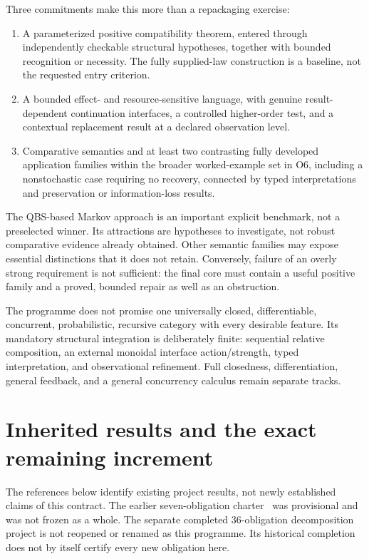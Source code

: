 \documentclass[11pt,a4paper]{article}
\begin{document}
Three commitments make this more than a repackaging exercise:
\begin{enumerate}
\item A parameterized positive compatibility theorem, entered through
independently checkable structural hypotheses, together with bounded
recognition or necessity. The fully supplied-law construction is a baseline,
not the requested entry criterion.
\item A bounded effect- and resource-sensitive language, with genuine
result-dependent continuation interfaces, a controlled higher-order test,
and a contextual replacement result at a declared observation level.
\item Comparative semantics and at least two contrasting fully developed
application families within the broader worked-example set in O6, including
a nonstochastic case requiring no recovery, connected by typed
interpretations and preservation or information-loss results.
\end{enumerate}

The QBS-based Markov approach is an important explicit benchmark, not a
preselected winner. Its attractions are hypotheses to investigate, not robust
comparative evidence already obtained. Other semantic families may expose
essential distinctions that it does not retain. Conversely, failure of an
overly strong requirement is not sufficient: the final core must contain a
useful positive family and a proved, bounded repair as well as an obstruction.

The programme does not promise one universally closed, differentiable,
concurrent, probabilistic, recursive category with every desirable feature.
Its mandatory structural integration is deliberately finite: sequential
relative composition, an external monoidal interface action/strength, typed
interpretation, and observational refinement. Full closedness, differentiation,
general feedback, and a general concurrency calculus remain separate tracks.

\section{Inherited results and the exact remaining increment}\label{sec:inherited}

The references below identify existing project results, not newly established
claims of this contract. The earlier seven-obligation charter~\cite{Charter} was provisional
and was not frozen as a whole. The separate completed 36-obligation
decomposition project is not reopened or renamed as this programme. Its
historical completion does not by itself certify every new obligation here.
\end{document}
